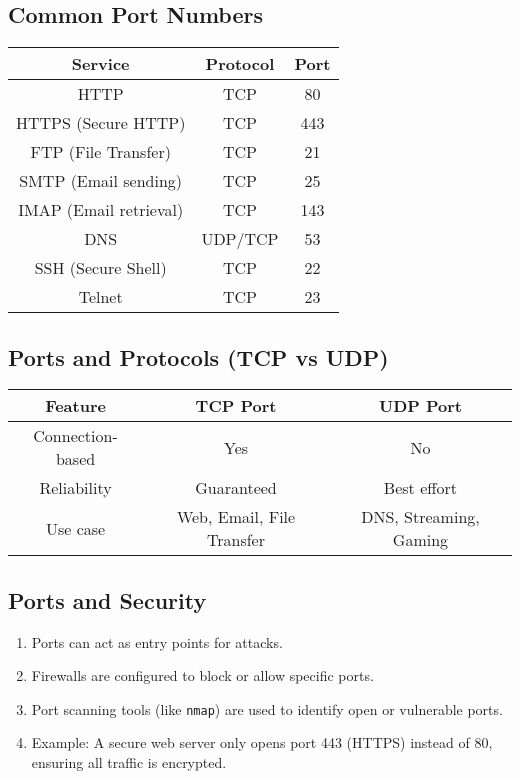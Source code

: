 \documentclass[12pt]{article}
\begin{document}
\subsection{Common Port Numbers}
\begin{center}
    \begin{tabular}{|c|c|c|}
        \hline
        \textbf{Service}       & \textbf{Protocol} & \textbf{Port} \\
        \hline
        HTTP                   & TCP               & 80            \\
        HTTPS (Secure HTTP)    & TCP               & 443           \\
        FTP (File Transfer)    & TCP               & 21            \\
        SMTP (Email sending)   & TCP               & 25            \\
        IMAP (Email retrieval) & TCP               & 143           \\
        DNS                    & UDP/TCP           & 53            \\
        SSH (Secure Shell)     & TCP               & 22            \\
        Telnet                 & TCP               & 23            \\
        \hline
    \end{tabular}
\end{center}

\subsection{Ports and Protocols (TCP vs UDP)}
\begin{center}
    \begin{tabular}{|c|c|c|}
        \hline
        \textbf{Feature} & \textbf{TCP Port}         & \textbf{UDP Port}      \\
        \hline
        Connection-based & Yes                       & No                     \\
        Reliability      & Guaranteed                & Best effort            \\
        Use case         & Web, Email, File Transfer & DNS, Streaming, Gaming \\
        \hline
    \end{tabular}
\end{center}

\subsection{Ports and Security}
\begin{enumerate}
    \item Ports can act as entry points for attacks.
    \item Firewalls are configured to block or allow specific ports.
    \item Port scanning tools (like \texttt{nmap}) are used to identify open or vulnerable ports.
    \item Example: A secure web server only opens port 443 (HTTPS) instead of 80, ensuring all traffic is encrypted.
\end{enumerate}
\end{document}
